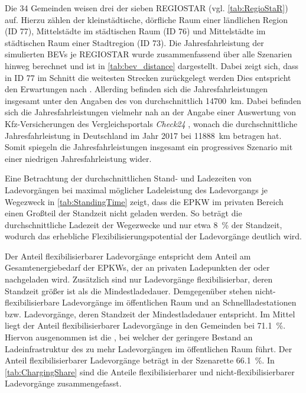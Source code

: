 Die \num{34} Gemeinden weisen drei der sieben \gls{REGIOSTAR} (vgl. \autoref{tab:RegioStaR}) auf.
Hierzu zählen der kleinstädtische, dörfliche Raum einer ländlichen Region (\gls{ID} \num{77}), Mittelstädte im städtischen Raum (\gls{ID} \num{76}) und Mittelstädte im städtischen Raum einer Stadtregion (\gls{ID} \num{73}).
Die Jahresfahrleistung der simulierten \glspl{BEV} je \gls{REGIOSTAR} wurde zusammenfassend über alle Szenarien hinweg berechnet und ist in \autoref{tab:bev_distance} dargestellt.
Dabei zeigt sich, dass in \gls{ID} \num{77} im Schnitt die weitesten Strecken zurückgelegt werden
Dies entspricht den Erwartungen nach  \cite{Nobis2019}.
Allerding befinden sich die Jahresfahrleistungen insgesamt unter den Angaben des  von durchschnittlich \SI{14700}{\km}.
Dabei befinden sich die Jahresfahrleistungen vielmehr nah an der Angabe einer Auswertung von Kfz-Versicherungen des Vergleichsportals \textit{Check24} \cite{CHECK24GmbH2018}, wonach die durchschnittliche Jahresfahrleistung in Deutschland im Jahr \num{2017} bei \SI{11888}{\km} betragen hat.
Somit spiegeln die Jahresfahrleistungen  insgesamt ein progressives Szenario mit einer niedrigen Jahresfahrleistung wider.




Eine Betrachtung der durchschnittlichen Stand- und Ladezeiten von Ladevorgängen bei maximal möglicher Ladeleistung des Ladevorgangs je Wegezweck in \autoref{tab:StandingTime} zeigt, dass die \gls{EPKW} im privaten Bereich einen Großteil der Standzeit nicht geladen werden.
So beträgt die durchschnittliche Ladezeit der Wegezwecke \nH und \Arbeit nur etwa \SI{8}{\percent} der Standzeit, wodurch das erhebliche Flexibilisierungspotential der Ladevorgänge deutlich wird.



Der Anteil flexibilisierbarer Ladevorgänge entspricht dem Anteil am Gesamtenergiebedarf der \glspl{EPKW}, der an privaten Ladepunkten der \UCs \zH oder \Firmeparkplatz nachgeladen wird.
Zusätzlich sind nur Ladevorgänge flexibilisierbar, deren Standzeit größer ist als die Mindestladedauer.
Demgegenüber stehen nicht-flexibilisierbare Ladevorgänge im öffentlichen Raum und an Schnellladestationen bzw. Ladevorgänge, deren Standzeit der Mindestladedauer entspricht.
Im Mittel liegt der Anteil flexibilisierbarer Ladevorgänge in den Gemeinden bei \SI{71.1}{\percent}.
Hiervon ausgenommen ist die \SzeFirmenparkplatzdot, bei welcher der geringere Bestand an Ladeinfrastruktur des \UC \Firmeparkplatz zu mehr Ladevorgängen im öffentlichen Raum führt.
Der Anteil flexibilisierbarer Ladevorgänge beträgt in der Szenarette \SI{66.1}{\percent}.
In \autoref{tab:ChargingShare} sind die Anteile flexibilisierbarer und nicht-flexibilisierbarer Ladevorgänge zusammengefasst.


